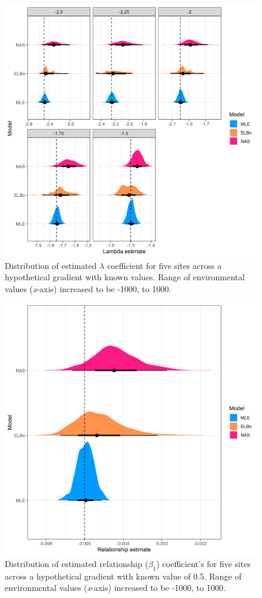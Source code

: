 \documentclass[
]{article}
\begin{document}
\begin{figure}
\centering
\includegraphics{figures/PLB_large_x_est_b_density.png}
\caption{Distribution of estimated \(\lambda\) coefficient for five
sites across a hypothetical gradient with known values. Range of
environmental values (\emph{x}-axis) increased to be -1000, to 1000.}
\end{figure}

\newpage

\begin{figure}
\centering
\includegraphics{figures/PLB_large_x_relationship_density.png}
\caption{Distribution of estimated relationship (\(\beta_1\))
coefficient's for five sites across a hypothetical gradient with known
value of 0.5. Range of environmental values (\emph{x}-axis) increased to
be -1000, to 1000.}
\end{figure}
\end{document}
